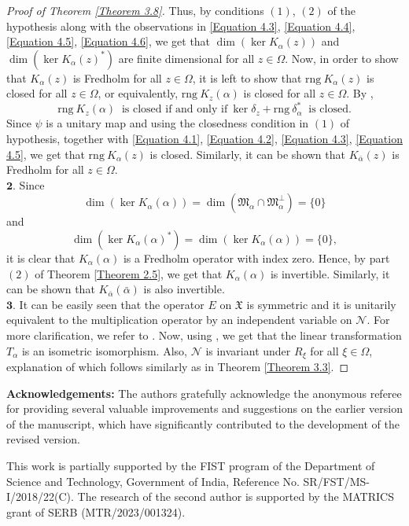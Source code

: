 \documentclass [12pt,reqno]{amsart}
\numberwithin{equation}{subsection}
\numberwithin{equation}{section}
\begin{document}
\begin{proof}[Proof of Theorem \ref{Theorem 3.8}]
Thus, by conditions $(1)$, $(2)$ of the hypothesis along with the observations in \eqref{Equation 4.3}, \eqref{Equation 4.4}, \eqref{Equation 4.5}, \eqref{Equation 4.6}, we get that $\dim(\ker K_{\alpha}(z))$ and $\dim(\ker K_{\alpha}(z)^*)$ are finite dimensional for all $z \in \Omega $. Now, in order to show that $K_{\alpha}(z)$ is Fredholm for all $z \in \Omega$, it is left to show that $\mathrm{rng}~K_{\alpha}(z)$ is closed for all $z \in \Omega$, or equivalently, $\mathrm{rng}~K_{z}(\alpha)$ is closed for all $z \in \Omega$. By \cite[Corollary $2.5$]{prod}, $$\mathrm{rng}~K_{z}(\alpha) ~\mbox{ is closed if and only if}~ \ker\delta_z+ \mathrm{rng}~\delta_{\alpha}^*~\mbox{ is closed}.$$ 
Since $\psi$ is a unitary map and using the closedness condition in $(1)$ of hypothesis, together with \eqref{Equation 4.1}, \eqref{Equation 4.2}, \eqref{Equation 4.3}, \eqref{Equation 4.5}, we get that $\mathrm{rng}~K_{\alpha}(z)$ is closed. Similarly, it can be shown that $K_{\bar{\alpha}}(z)$ is Fredholm for all $z \in \Omega $.\\
$\textbf{2.}$ Since $$\dim(\ker K_{\alpha}(\alpha))= \dim(\mathfrak{M}_{\alpha} \cap \mathfrak{M}_{\alpha}^{\perp})=\{  0 \}$$ and $$\dim(\ker K_{\alpha}(\alpha)^*)= \dim(\ker K_{\alpha}(\alpha))=\{  0 \} ,$$
it is clear that $ K_{\alpha}(\alpha)$ is a Fredholm operator with index zero. Hence, by part $(2)$ of Theorem \ref{Theorem 2.5}, we get that $ K_{\alpha}(\alpha)$ is invertible. Similarly, it can be shown that $ K_{\bar{\alpha}}(\bar{\alpha})$ is also invertible.\\
$\textbf{3.}$ It can be easily seen that the operator $E$ on $\mathfrak{X}$ is symmetric and it is unitarily equivalent to the multiplication operator by an independent variable on $\mathcal{N}$. For more clarification, we refer to \cite[Section $10$]{mahapatra}. Now, using \cite[Lemma $7.4$]{mahapatra}, we get that the linear transformation $T_{\alpha}$ is an isometric isomorphism. Also, $\mathcal{N}$ is invariant under $R_{\xi}$ for all $\xi \in \Omega$, explanation of which follows similarly as in Theorem \ref{Theorem 3.3}.
\end{proof}

\noindent


\textbf{Acknowledgements:} The authors gratefully acknowledge the anonymous referee for providing several valuable improvements and suggestions on the earlier version of the manuscript, which have significantly contributed to the development of the revised version.

This work is partially supported by the FIST program of the Department of Science and Technology, Government of India, Reference No. SR/FST/MS-I/2018/22(C). The research of the second author is supported by the MATRICS grant of SERB
(MTR/2023/001324).\\
\end{document}
